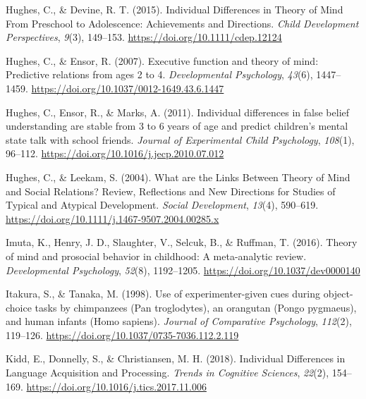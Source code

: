 \documentclass[
  man,floatsintext]{apa6}
\newlength{\cslhangindent}
\newlength{\cslentryspacingunit} %
\newenvironment{CSLReferences}[2] %
 {%
  \setlength{\parindent}{0pt}
  \ifodd #1
  \let\oldpar\par
  \def\par{\hangindent=\cslhangindent\oldpar}
  \fi
  \setlength{\parskip}{#2\cslentryspacingunit}
 }%
 {}
\begin{document}
\begin{CSLReferences}{1}{0}
\leavevmode{}%
Hughes, C., \& Devine, R. T. (2015). Individual {Differences} in {Theory} of {Mind From Preschool} to {Adolescence}: {Achievements} and {Directions}. \emph{Child Development Perspectives}, \emph{9}(3), 149--153. \url{https://doi.org/10.1111/cdep.12124}

\leavevmode{}%
Hughes, C., \& Ensor, R. (2007). Executive function and theory of mind: {Predictive} relations from ages 2 to 4. \emph{Developmental Psychology}, \emph{43}(6), 1447--1459. \url{https://doi.org/10.1037/0012-1649.43.6.1447}

\leavevmode{}%
Hughes, C., Ensor, R., \& Marks, A. (2011). Individual differences in false belief understanding are stable from 3 to 6 years of age and predict children's mental state talk with school friends. \emph{Journal of Experimental Child Psychology}, \emph{108}(1), 96--112. \url{https://doi.org/10.1016/j.jecp.2010.07.012}

\leavevmode{}%
Hughes, C., \& Leekam, S. (2004). What are the {Links Between Theory} of {Mind} and {Social Relations}? {Review}, {Reflections} and {New Directions} for {Studies} of {Typical} and {Atypical Development}. \emph{Social Development}, \emph{13}(4), 590--619. \url{https://doi.org/10.1111/j.1467-9507.2004.00285.x}

\leavevmode{}%
Imuta, K., Henry, J. D., Slaughter, V., Selcuk, B., \& Ruffman, T. (2016). Theory of mind and prosocial behavior in childhood: {A} meta-analytic review. \emph{Developmental Psychology}, \emph{52}(8), 1192--1205. \url{https://doi.org/10.1037/dev0000140}

\leavevmode{}%
Itakura, S., \& Tanaka, M. (1998). Use of experimenter-given cues during object-choice tasks by chimpanzees ({Pan} troglodytes), an orangutan ({Pongo} pygmaeus), and human infants ({Homo} sapiens). \emph{Journal of Comparative Psychology}, \emph{112}(2), 119--126. \url{https://doi.org/10.1037/0735-7036.112.2.119}

\leavevmode{}%
Kidd, E., Donnelly, S., \& Christiansen, M. H. (2018). Individual {Differences} in {Language Acquisition} and {Processing}. \emph{Trends in Cognitive Sciences}, \emph{22}(2), 154--169. \url{https://doi.org/10.1016/j.tics.2017.11.006}


\end{CSLReferences}
\end{document}
